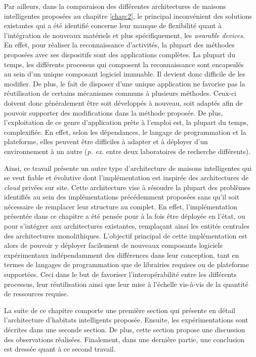 Par ailleurs, dans la comparaison des différentes architectures de maisons intelligentes proposées au chapitre \ref{chap:2}, le principal inconvénient des solutions existantes qui a été identifié concerne leur manque de flexibilité quant à l'intégration de nouveaux matériels et plus spécifiquement, les \textit{wearable devices}. En effet, pour réaliser la reconnaissance d'activités, la plupart des méthodes proposées avec ses dispositifs sont des applications complètes. La plupart du temps, les différents processus qui composent la reconnaissance sont encapsulés au sein d'un unique composant logiciel immuable. Il devient donc difficile de les modifier. De plus, le fait de disposer d'une unique application ne favorise pas la réutilisation de certains mécanismes communs à plusieurs méthodes. Ceux-ci doivent donc généralement être soit développés à nouveau, soit adaptés afin de pouvoir supporter des modifications dans la méthode proposée. De plus, l'exploitation de ce genre d'application \og prête à l'emploi \fg est, la plupart du temps, complexifiée. En effet, selon les dépendances, le langage de programmation et la plateforme, elles peuvent être difficiles à adapter et à déployer d'un environnement à un autre (\textit{p. ex.} entre deux laboratoires de recherche différents).

Ainsi, ce travail présente un autre type d'architecture de maisons intelligentes qui se veut fiable et évolutive dont l'implémentation est inspirée des architectures de \textit{cloud} privées sur site. Cette architecture vise à résoudre la plupart des problèmes identifiés au sein des implémentations précédemment proposées sans qu'il soit nécessaire de remplacer leur structure au complet. En effet, l'implémentation présentée dans ce chapitre a été pensée pour à la fois être déployée en l'état, ou pour s'intégrer aux architectures existantes, remplaçant ainsi les entités centrales des architectures monolithiques. L'objectif principal de cette implémentation est alors de pouvoir y déployer facilement de nouveaux composants logiciels expérimentaux indépendamment des différences dans leur conception, tant en termes de langages de programmation que de librairies requises ou de plateforme supportées. Ceci dans le but de favoriser l'interopérabilité entre les différents processus, leur réutilisation ainsi que leur mise à l'échelle vis-à-vis de la quantité de ressources requise.

La suite de ce chapitre comporte une première section qui présente en détail l'architecture d'habitats intelligents proposée. Ensuite, les expérimentations sont décrites dans une seconde section. De plus, cette section propose une discussion des observations réalisées. Finalement, dans une dernière partie, une conclusion est dressée quant à ce second travail.

